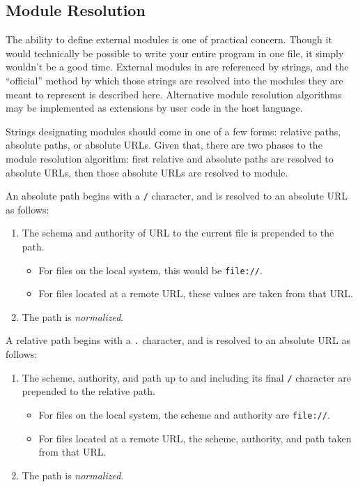 \subsection{Module Resolution}
\label{sec:module-resolution}

The ability to define external modules is one of practical concern. Though it
would technically be possible to write your entire program in one file,
it simply wouldn't be a good time. External modules in \Trilogy{} are
referenced by strings, and the ``official'' method by which those strings
are resolved into the modules they are meant to represent is described here.
Alternative module resolution algorithms may be implemented as extensions by
user code in the host language.

Strings designating modules should come in one of a few forms: relative paths,
absolute paths, or absolute URLs. Given that, there are two phases to the module
resolution algorithm: first relative and absolute paths are resolved to absolute
URLs, then those absolute URLs are resolved to module.

An absolute path begins with a \texttt{/} character, and is resolved to an absolute
URL as follows:

\begin{enumerate}
    \item The schema and authority of URL to the current \Trilogy{} file is prepended
    to the path.
    \begin{itemize}
        \item For files on the local system, this would be \texttt{file://}.
        \item For files located at a remote URL, these values are taken from that URL.
    \end{itemize}
    \item The path is \emph{normalized}.
\end{enumerate}

\noindent
A relative path begins with a \texttt{.} character, and is resolved to an absolute
URL as follows:

\begin{enumerate}
    \item The scheme, authority, and path up to and including its final \texttt{/} character
    are prepended to the relative path.
    \begin{itemize}
        \item For files on the local system, the scheme and authority are \texttt{file://}.
        \item For files located at a remote URL, the scheme, authority, and path taken
        from that URL.
    \end{itemize}
    \item The path is \emph{normalized}.
\end{enumerate}

